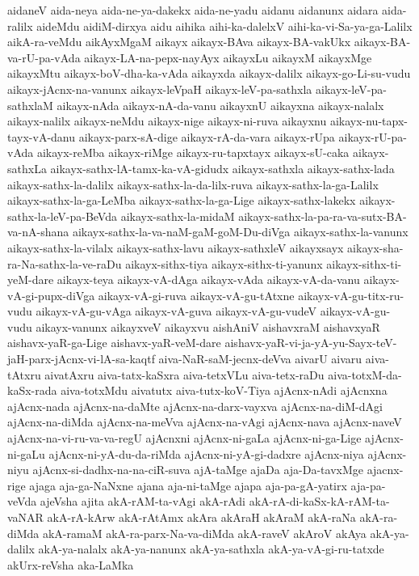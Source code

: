 {aidaneV
aida-neya
aida-ne-ya-dakekx
aida-ne-yadu
aidanu
aidanunx
aidara
aida-ralilx
aideMdu
aidiM-dirxya
aidu
aihika
aihi-ka-dalelxV
aihi-ka-vi-Sa-ya-ga-Lalilx
aikA-ra-veMdu
aikAyxMgaM
aikayx
aikayx-BAva
aikayx-BA-vakUkx
aikayx-BA-va-rU-pa-vAda
aikayx-LA-na-pepx-nayAyx
aikayxLu
aikayxM
aikayxMge
aikayxMtu
aikayx-boV-dha-ka-vAda
aikayxda
aikayx-dalilx
aikayx-go-Li-su-vudu
aikayx-jAcnx-na-vanunx
aikayx-leVpaH
aikayx-leV-pa-sathxla
aikayx-leV-pa-sathxlaM
aikayx-nAda
aikayx-nA-da-vanu
aikayxnU
aikayxna
aikayx-nalalx
aikayx-nalilx
aikayx-neMdu
aikayx-nige
aikayx-ni-ruva
aikayxnu
aikayx-nu-tapx-tayx-vA-danu
aikayx-parx-sA-dige
aikayx-rA-da-vara
aikayx-rUpa
aikayx-rU-pa-vAda
aikayx-reMba
aikayx-riMge
aikayx-ru-tapxtayx
aikayx-sU-caka
aikayx-sathxLa
aikayx-sathx-lA-tamx-ka-vA-gidudx
aikayx-sathxla
aikayx-sathx-lada
aikayx-sathx-la-dalilx
aikayx-sathx-la-da-lilx-ruva
aikayx-sathx-la-ga-Lalilx
aikayx-sathx-la-ga-LeMba
aikayx-sathx-la-ga-Lige
aikayx-sathx-lakekx
aikayx-sathx-la-leV-pa-BeVda
aikayx-sathx-la-midaM
aikayx-sathx-la-pa-ra-va-sutx-BA-va-nA-shana
aikayx-sathx-la-va-naM-gaM-goM-Du-diVga
aikayx-sathx-la-vanunx
aikayx-sathx-la-vilalx
aikayx-sathx-lavu
aikayx-sathxleV
aikayxsayx
aikayx-sha-ra-Na-sathx-la-ve-raDu
aikayx-sithx-tiya
aikayx-sithx-ti-yanunx
aikayx-sithx-ti-yeM-dare
aikayx-teya
aikayx-vA-dAga
aikayx-vAda
aikayx-vA-da-vanu
aikayx-vA-gi-pupx-diVga
aikayx-vA-gi-ruva
aikayx-vA-gu-tAtxne
aikayx-vA-gu-titx-ru-vudu
aikayx-vA-gu-vAga
aikayx-vA-guva
aikayx-vA-gu-vudeV
aikayx-vA-gu-vudu
aikayx-vanunx
aikayxveV
aikayxvu
aishAniV
aishavxraM
aishavxyaR
aishavx-yaR-ga-Lige
aishavx-yaR-veM-dare
aishavx-yaR-vi-ja-yA-yu-Sayx-teV-jaH-parx-jAcnx-vi-lA-sa-kaqtf
aiva-NaR-saM-jecnx-deVva
aivarU
aivaru
aiva-tAtxru
aivatAxru
aiva-tatx-kaSxra
aiva-tetxVLu
aiva-tetx-raDu
aiva-totxM-da-kaSx-rada
aiva-totxMdu
aivatutx
aiva-tutx-koV-Tiya
ajAcnx-nAdi
ajAcnxna
ajAcnx-nada
ajAcnx-na-daMte
ajAcnx-na-darx-vayxva
ajAcnx-na-diM-dAgi
ajAcnx-na-diMda
ajAcnx-na-meVva
ajAcnx-na-vAgi
ajAcnx-nava
ajAcnx-naveV
ajAcnx-na-vi-ru-va-va-regU
ajAcnxni
ajAcnx-ni-gaLa
ajAcnx-ni-ga-Lige
ajAcnx-ni-gaLu
ajAcnx-ni-yA-du-da-riMda
ajAcnx-ni-yA-gi-dadxre
ajAcnx-niya
ajAcnx-niyu
ajAcnx-si-dadhx-na-na-ciR-suva
ajA-taMge
ajaDa
aja-Da-tavxMge
ajacnx-rige
ajaga
aja-ga-NaNxne
ajana
aja-ni-taMge
ajapa
aja-pa-gA-yatirx
aja-pa-veVda
ajeVsha
ajita
akA-rAM-ta-vAgi
akA-rAdi
akA-rA-di-kaSx-kA-rAM-ta-vaNAR
akA-rA-kArw
akA-rAtAmx
akAra
akAraH
akAraM
akA-raNa
akA-ra-diMda
akA-ramaM
akA-ra-parx-Na-va-diMda
akA-raveV
akAroV
akAya
akA-ya-dalilx
akA-ya-nalalx
akA-ya-nanunx
akA-ya-sathxla
akA-ya-vA-gi-ru-tatxde
akUrx-reVsha
aka-LaMka
}
